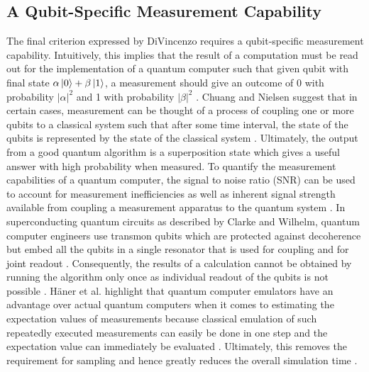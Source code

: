 \subsection{A Qubit-Specific Measurement Capability}

The final criterion expressed by DiVincenzo requires a qubit-specific measurement capability. Intuitively, this implies that the result of a computation must be read out for the implementation of a quantum computer such that given qubit with final state $\alpha\ket{0} + \beta\ket{1}$, a measurement should give an outcome of 0 with probability $|\alpha|^2$ and 1 with probability $|\beta|^2$ \cite{DeWolf2019}. Chuang and Nielsen suggest that in certain cases, measurement can be thought of a process of coupling one or more qubits to a classical system such that after some time interval, the state of the qubits is represented by the state of the classical system \cite{Nielsen2010}. Ultimately, the output from a good quantum algorithm is a superposition state which gives a useful answer with high probability when measured. To quantify the measurement capabilities of a quantum computer, the signal to noise ratio (SNR) can be used to account for measurement inefficiencies as well as inherent signal strength available from coupling a measurement apparatus to the quantum system \cite{Nielsen2010}. In superconducting quantum circuits as described by Clarke and Wilhelm, quantum computer engineers use transmon qubits which are protected against decoherence but embed all the qubits in a single resonator that is used for coupling and for joint readout \cite{clarke2008superconducting, dewes2012characterization}. Consequently, the results of a calculation cannot be obtained by running the algorithm only once as individual readout of the qubits is not possible \cite{dewes2012characterization}. H\"{a}ner et al. highlight that quantum computer emulators have an advantage over actual quantum computers when it comes to estimating the expectation values of measurements because classical emulation of such repeatedly executed measurements can easily be done in one step and the expectation value can immediately be evaluated \cite{haner2016high}. Ultimately, this removes the requirement for sampling and hence greatly reduces the overall simulation time \cite{haner2016high}. 

